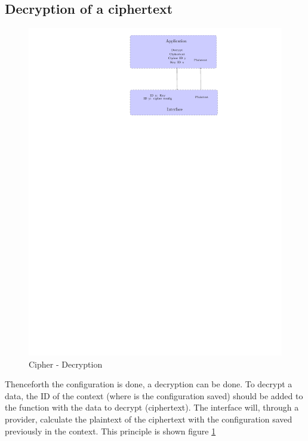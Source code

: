 \subsection*{Decryption of a ciphertext}
\begin{figure}[!ht]
\centering
\includegraphics[trim=16cm 20cm 9.5cm 0cm]{figures/cipher_decrypt.pdf}
\caption{Cipher - Decryption\newline}
\label{fig:gci_cipher_decrypt}
\end{figure}
Thenceforth the configuration is done, a decryption can be done.\newline
To decrypt a data, the ID of the context (where is the configuration saved)
should be added to the function with the data to decrypt (ciphertext).\newline
The interface will, through a provider, calculate the plaintext of the
ciphertext with the configuration saved previously in the context.\newline
This principle is shown figure \ref{fig:gci_cipher_decrypt}
\newpage
